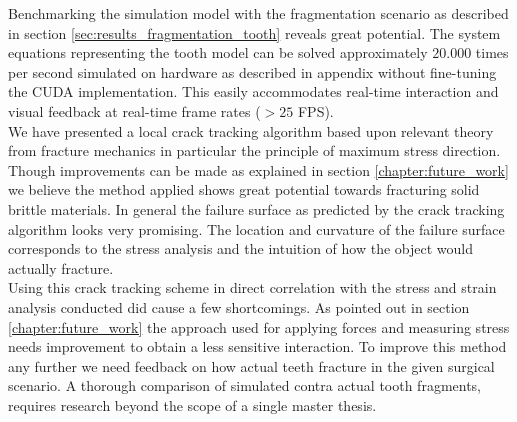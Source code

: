 %
Benchmarking the simulation model with the fragmentation scenario as
described in section \vref{sec:results_fragmentation_tooth} reveals great
potential. 
%
The system equations representing the tooth model can be solved
approximately $20.000$ times per second simulated on hardware as
described in appendix  without
fine-tuning the CUDA implementation. This easily accommodates
real-time interaction and visual feedback at real-time frame rates ($>
25$ FPS). \\

We have presented a local crack tracking algorithm based upon relevant 
theory from fracture mechanics in particular the principle of maximum
stress direction. 
%
Though improvements can be made as explained in section
\vref{chapter:future_work} we believe the method applied 
shows great potential towards fracturing solid brittle materials.
%
In general the failure surface as predicted by the
crack tracking algorithm looks very promising. The location and
curvature of the failure surface corresponds to the stress analysis
and the intuition of how the object would actually fracture. \\

Using this crack tracking scheme in direct correlation with
the stress and strain analysis conducted did cause a few
shortcomings. As pointed out in section \vref{chapter:future_work} the
approach used for applying forces and 
measuring stress needs improvement to obtain a less sensitive
interaction. 
%
To improve this method any further we need feedback on how actual teeth
fracture in the given surgical scenario. A thorough comparison of simulated
contra actual tooth fragments, requires research beyond the scope of a
single master thesis.



